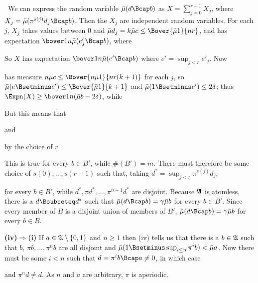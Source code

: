 {
     
\noindent\Prf\ We can express the random variable $\bar\mu(d\Bcap b)$ as
$X=\sum_{j=0}^{r-1}X_j$, where $X_j=\bar\mu(\pi^{s(j)}d_j\Bcap b)$.
Then the $X_j$ are independent random variables.   For each $j$, $X_j$
takes values between $0$ and
$\bar\mu d_j=k\bar\mu c\le\Bover{\bar\mu 1}{nr}$, and
has expectation $\bover1n\bar\mu(e'_j\Bcap b)$, where
     
     
\noindent So $X$ has expectation $\bover1n\bar\mu(e'\Bcap b)$ where
$e'=\sup_{j<r}e'_j$.   Now
     
     
\noindent has measure $n\bar\mu c\le\Bover{n\bar\mu 1}{nr(k+1)}$ for
each $j$, so $\bar\mu(e\Bsetminus e')\le\Bover{\bar\mu 1}{k+1}$ and
$\bar\mu(1\Bsetminus e')\le 2\delta$;  thus
$\Expn(X)\ge\bover1n(\bar\mu b-2\delta)$, while
     
     
\noindent But this means that
     
     
\noindent and
     
     
\noindent by the choice of $r$.\ \Qed
     
This is true for every $b\in B'$, while $\#(B')=m$.   There must
therefore be some choice of $s(0),\ldots,s(r-1)$ such that,
taking $d^*=\sup_{j<r}\pi^{s(j)}d_j$,
     
     
\noindent for every $b\in B'$, while $d^*,\pi
d^*,\ldots,\pi^{n-1}d^*$ are
disjoint.   Because $\frak A$ is atomless, there is a $d\Bsubseteq d^*$
such that $\bar\mu(d\Bcap b)=\gamma\bar\mu b$ for every $b\in B'$.
Since every member of $B$ is a disjoint union of members of $B'$,
$\bar\mu(d\Bcap b)=\gamma\bar\mu b$ for every $b\in B$.
     
\medskip
     
{\bf(iv)$\Rightarrow$(i)} If $a\in\frak A\setminus\{0,1\}$ and $n\ge 1$
then (iv) tells us that there is a $b\in\frak A$ such that $b$,
$\pi b,\ldots,\pi^nb$ are all disjoint and
$\bar\mu(1\Bsetminus\sup_{i\le n}\pi^ib)<\bar\mu a$.   Now there must
be some $i<n$ such that $d=\pi^ib\Bcap a\ne 0$, in which case
     
     
\noindent and $\pi^nd\ne d$.   As $n$ and $a$ are arbitrary, $\pi$ is
aperiodic.
}%
     
